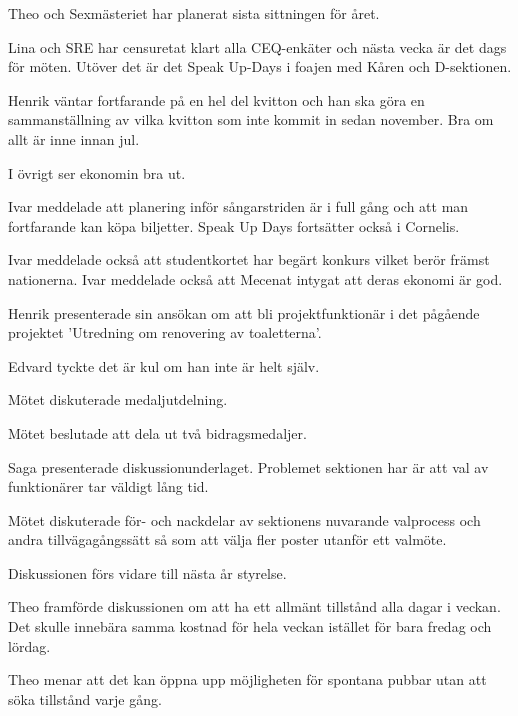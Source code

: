 \documentclass[10pt]{article}
\begin{document}
\begin{paragrafer}
\begin{paragrafer}
Theo och Sexmästeriet har planerat sista sittningen för året.

Lina och SRE har censuretat klart alla CEQ-enkäter och nästa vecka är det dags för möten. Utöver det är det Speak Up-Days i foajen med Kåren och D-sektionen.
 
Henrik väntar fortfarande på en hel del kvitton och han ska göra en sammanställning av vilka kvitton som inte kommit in sedan november. Bra om allt är inne innan jul. 

I övrigt ser ekonomin bra ut. 


Ivar meddelade att planering inför sångarstriden är i full gång och att man fortfarande kan köpa biljetter. Speak Up Days fortsätter också i Cornelis. 

Ivar meddelade också att studentkortet har begärt konkurs vilket berör främst nationerna. Ivar meddelade också att Mecenat intygat att deras ekonomi är god. 

\end{paragrafer}

Henrik presenterade sin ansökan om att bli projektfunktionär i det pågående projektet 'Utredning om renovering av toaletterna'. 

Edvard tyckte det är kul om han inte är helt själv. 

\Mbaby 


Mötet diskuterade medaljutdelning. 

Mötet beslutade att dela ut två bidragsmedaljer. 

Saga presenterade diskussionunderlaget. Problemet sektionen har är att val av funktionärer tar väldigt lång tid. 

Mötet diskuterade för- och nackdelar av sektionens nuvarande valprocess och andra tillvägagångssätt så som att välja fler poster utanför ett valmöte. 

Diskussionen förs vidare till nästa år styrelse. 


Theo framförde diskussionen om att ha ett allmänt tillstånd alla dagar i veckan. Det skulle innebära samma kostnad för hela veckan istället för bara fredag och lördag.

Theo menar att det kan öppna upp möjligheten för spontana pubbar utan att söka tillstånd varje gång.


\end{paragrafer}
\end{document}
